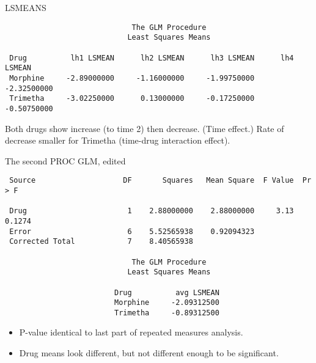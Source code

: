 \documentclass[pdf]{prosper}
\begin{document}
\begin{slide}{LSMEANS}

{\scriptsize
\begin{verbatim}
                             The GLM Procedure
                            Least Squares Means

 Drug          lh1 LSMEAN      lh2 LSMEAN      lh3 LSMEAN      lh4 LSMEAN
 Morphine     -2.89000000     -1.16000000     -1.99750000     -2.32500000
 Trimetha     -3.02250000      0.13000000     -0.17250000     -0.50750000

\end{verbatim}
}

Both drugs show increase (to time 2) then decrease. (Time effect.) Rate of decrease smaller for Trimetha (time-drug interaction effect).
    
  \end{slide}

  \begin{slide}{The second PROC GLM, edited}

{\scriptsize
\begin{verbatim}
 Source                    DF       Squares   Mean Square  F Value  Pr > F

 Drug                       1    2.88000000    2.88000000     3.13  0.1274
 Error                      6    5.52565938    0.92094323                 
 Corrected Total            7    8.40565938                               

                             The GLM Procedure
                            Least Squares Means

                         Drug          avg LSMEAN
                         Morphine     -2.09312500
                         Trimetha     -0.89312500

\end{verbatim}
}
\begin{itemize}
\item P-value identical to last part of repeated measures analysis.
\item Drug means look different, but not different enough to be significant.
\end{itemize}
    
  \end{slide}
\end{document}
